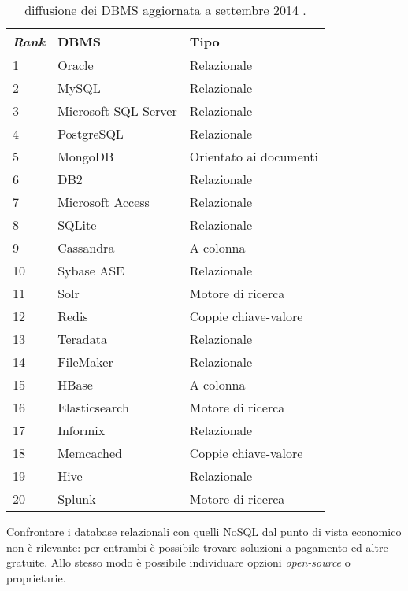 \begin{table}[ht]
\centering
\begin{tabular}{|l|l|l|}
\hline
\textit{Rank} & DBMS                 & Tipo                   \\ \hline
1    & Oracle               & Relazionale            \\
2    & MySQL                & Relazionale            \\
3    & Microsoft SQL Server & Relazionale            \\
4    & PostgreSQL           & Relazionale            \\
5    & MongoDB              & Orientato ai documenti \\
6    & DB2                  & Relazionale            \\
7    & Microsoft Access     & Relazionale            \\
8    & SQLite               & Relazionale            \\
9    & Cassandra            & A colonna              \\
10   & Sybase ASE           & Relazionale            \\
11   & Solr                 & Motore di ricerca      \\
12   & Redis                & Coppie chiave-valore   \\
13   & Teradata             & Relazionale            \\
14   & FileMaker            & Relazionale            \\
15   & HBase                & A colonna              \\
16   & Elasticsearch        & Motore di ricerca      \\
17   & Informix             & Relazionale            \\
18   & Memcached            & Coppie chiave-valore   \\
19   & Hive                 & Relazionale            \\
20   & Splunk               & Motore di ricerca      \\ \hline
\end{tabular}
\caption{diffusione dei DBMS aggiornata a settembre 2014 \cite{URL:dbengines}.}
\label{table:spreadnosql}
\end{table}

Confrontare i database relazionali con quelli NoSQL dal punto di vista economico non è rilevante: per entrambi è possibile trovare soluzioni a pagamento ed altre gratuite. 
Allo stesso modo è possibile individuare opzioni \textit{open-source} o proprietarie.

